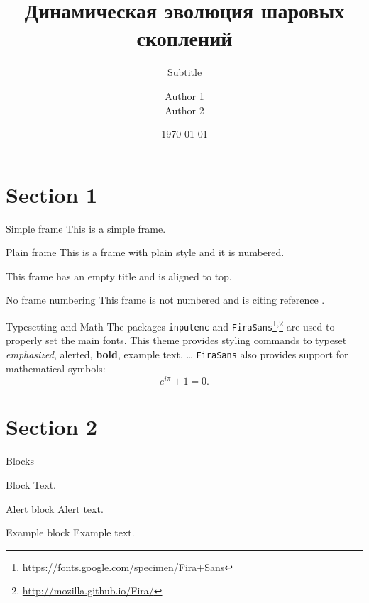 \documentclass{beamer}
\title{Динамическая эволюция шаровых скоплений}
\subtitle{Subtitle}
\author{Author 1 \\ Author 2}
\institute{Institute Name \\ Institute Address}
\date{\today}
\begin{document}
    \begin{frame}
        \maketitle
    \end{frame}
    
    \section{Section 1}
    \begin{frame}{Simple frame}
        This is a simple frame.
    \end{frame}

    \begin{frame}[plain]{Plain frame}
        This is a frame with plain style and it is numbered.
    \end{frame}
    
    \begin{frame}[t]
        This frame has an empty title and is aligned to top.
    \end{frame}
    
    \begin{frame}[noframenumbering]{No frame numbering}
        This frame is not numbered and is citing reference \cite{knuth74}.
    \end{frame}
    
    \begin{frame}{Typesetting and Math}
        The packages \texttt{inputenc} and \texttt{FiraSans}\footnote{\url{https://fonts.google.com/specimen/Fira+Sans}}\textsuperscript{,}\footnote{\url{http://mozilla.github.io/Fira/}} are used to properly set the main fonts.
        \vfill
        This theme provides styling commands to typeset \emph{emphasized}, \alert{alerted}, \textbf{bold}, \textcolor{example}{example text}, \dots
        \vfill
        \texttt{FiraSans} also provides support for mathematical symbols:
        \begin{equation*}
            e^{i\pi} + 1 = 0.
        \end{equation*}
    \end{frame}

    \section{Section 2}
    \begin{frame}{Blocks}
        \begin{block}{Block}
            Text.
        \end{block}
        \pause
        \begin{alertblock}{Alert block}
            Alert \alert{text}.
        \end{alertblock}
        \pause
        \begin{exampleblock}{Example block}
            Example \textcolor{example}{text}.
        \end{exampleblock}
    \end{frame}
    
\end{document}

